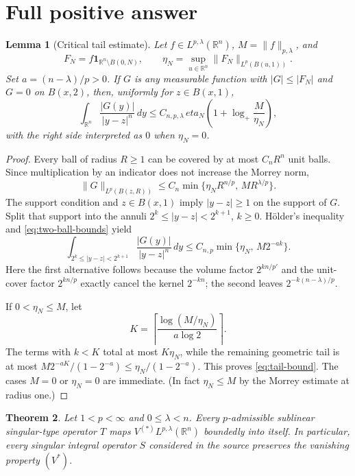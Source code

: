 \documentclass[11pt]{article}
\newtheorem{theorem}{Theorem}
\newtheorem{lemma}[theorem]{Lemma}
\newcommand{\R}{\mathbb R}
\newcommand{\1}{\mathbf 1}
\newcommand{\Mor}{L^{p,\lambda}(\R^n)}
\newcommand{\Vast}{V^{(\ast)}L^{p,\lambda}(\R^n)}
\begin{document}
\section{Full positive answer}

\begin{lemma}[Critical tail estimate]\label{lem:tail}
Let $f\in\Mor$, $M=\|f\|_{p,\lambda}$, and
\[
 F_N=f\1_{\R^n\setminus B(0,N)},\qquad
 \eta_N=\sup_{u\in\R^n}\|F_N\|_{L^p(B(u,1))}.
\]
Set $a=(n-\lambda)/p>0$.  If $G$ is any measurable function with
$|G|\leq|F_N|$ and $G=0$ on $B(x,2)$, then, uniformly for $z\in B(x,1)$,
\begin{equation}\label{eq:tail-bound}
 \int_{\R^n}\frac{|G(y)|}{|y-z|^n}\,dy
 \leq C_{n,p,\lambda}\,eta_N
 \left(1+\log_+\frac{M}{\eta_N}\right),
\end{equation}
with the right side interpreted as $0$ when $\eta_N=0$.
\end{lemma}

\begin{proof}
Every ball of radius $R\geq1$ can be covered by at most $C_nR^n$ unit
balls.  Since multiplication by an indicator does not increase the Morrey
norm,
\begin{equation}\label{eq:two-ball-bounds}
 \|G\|_{L^p(B(z,R))}
 \leq C_n\min\{\eta_NR^{n/p},\,MR^{\lambda/p}\}.
\end{equation}
The support condition and $z\in B(x,1)$ imply $|y-z|\geq1$ on the support of
$G$.  Split that support into the annuli
$2^k\leq|y-z|<2^{k+1}$, $k\geq0$.  H\"older's inequality and
\eqref{eq:two-ball-bounds} yield
\[
 \int_{2^k\leq|y-z|<2^{k+1}}
       \frac{|G(y)|}{|y-z|^n}\,dy
 \leq C_{n,p}\min\{\eta_N,\,M2^{-ak}\}.
\]
Here the first alternative follows because the volume factor
$2^{kn/p'}$ and the unit-cover factor $2^{kn/p}$ exactly cancel the kernel
$2^{-kn}$; the second leaves $2^{-k(n-\lambda)/p}$.

If $0<\eta_N\leq M$, let
\[
 K=\left\lceil\frac{\log(M/\eta_N)}{a\log2}\right\rceil.
\]
The terms with $k<K$ total at most $K\eta_N$, while the remaining geometric
tail is at most
$M2^{-aK}/(1-2^{-a})\leq\eta_N/(1-2^{-a})$.
This proves \eqref{eq:tail-bound}.  The cases $M=0$ or $\eta_N=0$ are
immediate.  (In fact $\eta_N\leq M$ by the Morrey estimate at radius one.)
\end{proof}

\begin{theorem}\label{thm:main}
Let $1<p<\infty$ and $0\leq\lambda<n$.  Every $p$-admissible sublinear
singular-type operator $T$ maps $\Vast$ boundedly into itself.  In
particular, every singular integral operator $S$ considered in the source
preserves the vanishing property $(V^\ast)$.
\end{theorem}
\end{document}
